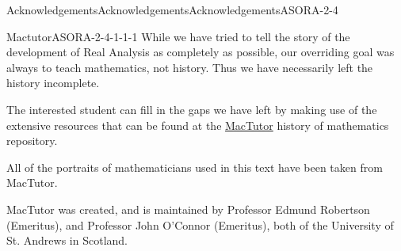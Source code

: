 \documentclass[oneside,10pt,]{book}
\numberwithin{equation}{part}
\begin{document}
\begin{acknowledgement}{Acknowledgements}{Acknowledgements}{}{Acknowledgements}{}{}{ASORA-2-4}
%
\begin{descriptionlist}
\begin{dlimedium}{Mactutor}{ASORA-2-4-1-1-1}%
While we have tried to tell the story of the development of Real Analysis as completely as possible, our overriding goal was always to teach mathematics, not history. Thus we have necessarily left the history incomplete.%
\par
The interested student can fill in the gaps we have left by making use of the extensive resources that can be found at the \href{https://mathshistory.st-andrews.ac.uk/}{MacTutor} history of mathematics repository.%
\par
All of the portraits of mathematicians used in this text have been taken from MacTutor.%
\par
MacTutor was created, and is maintained by Professor Edmund Robertson (Emeritus), and Professor John O'Connor (Emeritus), both of the University of St. Andrews in Scotland.%
\end{dlimedium}%
\end{descriptionlist}
%
\end{acknowledgement}
%
%
\typeout{************************************************}
\typeout{************************************************}
%
\end{document}
